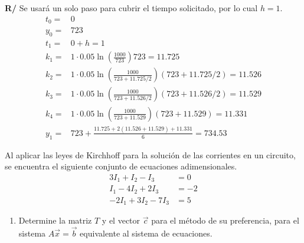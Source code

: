 \documentclass[12pt]{article}
\begin{document}
\begin{enumerate}[leftmargin=*,widest=9]
{\begin{enumerate}[label=\alph*]
\textbf{R/} Se usará un solo paso para cubrir el tiempo solicitado, por lo cual \(h = 1\).
\begin{eqnarray*}
t_0 =& 0\\
y_0 = &723\\
t_1 = &0 + h = 1\\
k_1 = &1 \cdot 0.05\ln \left( \frac{1000}{723} \right) 723 = 11.725\\
k_2 = &1 \cdot 0.05\ln \left( \frac{1000}{723 + 11.725/2} \right) (723 + 11.725/2) = 11.526\\
k_3 = &1 \cdot 0.05\ln \left( \frac{1000}{723 + 11.526/2} \right) (723 + 11.526/2) = 11.529\\
k_4 = &1 \cdot 0.05\ln \left( \frac{1000}{723 + 11.529} \right) (723 + 11.529) = 11.331\\
y_1 = &723 + \frac{11.725 + 2(11.526+11.529)+11.331}{6} = 734.53
\end{eqnarray*}
\end{enumerate}
   \item Al aplicar las leyes de Kirchhoff para la solución de las corrientes en un circuito, se encuentra el siguiente conjunto de ecuaciones adimensionales.
   \begin{align*}
   3I_1 + I_2 - I_3 & = 0 \\
   I_1 - 4 I_2 + 2I_3 & = -2 \\
   -2I_1 + 3I_2 -7 I_3 & = 5
   \end{align*}
   \begin{enumerate}[label=\alph*]
   \item Determine la matriz \(T\) y el vector \(\vec{c}\) para el método de su preferencia, para el sistema \(A\vec{x}=\vec{b}\) equivalente al sistema de ecuaciones.


\end{enumerate}}
\end{enumerate}
\end{document}
